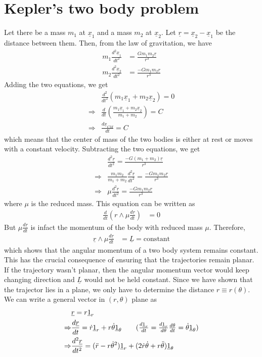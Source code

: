 \documentclass[11pt,a4paper]{article}
\newcommand{\vect}[1]{\underline{#1}}
\newcommand{\1}{\vect{1}}
\begin{document}
\section{Kepler's two body problem}
Let there be a mass $m_1$ at $\vect x_1$ and a mass $m_2$ at $\vect x_2$. Let $\vect r = \vect x_2 - \vect x_1$ be the distance between them. Then, from the law of gravitation, we have
\begin{align*}
m_1 \frac{d^2 \vect x_1}{dt^2} &= \frac{G m_1 m_2 \vect r}{r^3}\\
m_2 \frac{d^2 \vect x_2}{dt^2} &= \frac{-G m_1 m_2 \vect r}{r^3}
\end{align*}
Adding the two equations, we get
\begin{align*}
&\frac{d^2}{dt^2} (m_1\vect x_1 + m_2\vect x_2) = 0 \\
\Rightarrow&\frac{d}{dt} (\frac{m_1\vect x_1 + m_2\vect x_2}{m_1+m_2}) = C\\
\Rightarrow&\frac{d\vect x_{CM}}{dt} = C
\end{align*}
which means that the center of mass of the two bodies is either at rest or moves with a constant velocity. Subtracting the two equations, we get
\begin{align*}
&\frac{d^2\vect r}{dt^2} = \frac{-G (m_1 + m_2)\vect r}{r^3}\\
\Rightarrow&\frac{m_1m_2}{m_1 + m_2}\frac{d^2\vect r}{dt^2} = \frac{-G m_1 m_2 \vect r}{r^3}\\
\Rightarrow&\mu\frac{d^2\vect r}{dt^2} = \frac{-G m_1 m_2 \vect r}{r^3}
\end{align*}
where $\mu$ is the reduced mass. This equation can be written as
\begin{align*}
\frac{d}{dt}(r\wedge\mu \frac{d\vect r}{dt}) &= 0
\end{align*}
But $\mu \frac{d\vect r}{dt}$ is infact the momentum of the body with reduced mass $\mu$. Therefore,
\begin{align*}
\vect r \wedge \mu \frac{d\vect r}{dt} &= \vect L = \text{constant}
\end{align*}
which shows that the angular momentum of a two body system remains constant. This has the crucial consequence of ensuring that the trajectories remain planar. If the trajectory wasn't planar, then the angular momentum vector would keep changing direction and $\vect L$ would not be held constant. Since we have shown that the trajector lies in a plane, we only have to determine the distance $r \equiv r(\theta)$. We can write a general vector in $(r,\theta)$  plane as
\begin{align*}
&\vect r = r \1_r\\
\Rightarrow& \frac{d\vect r}{dt} = \dot{r}\1_r + r\dot\theta \1_{\theta} \tag{$\frac{d \vect 1_r}{dt} = \frac{d \vect 1_r}{d\theta}\frac{d\theta}{dt} = \dot{\theta} \vect 1_{\theta}$}\\
\Rightarrow& \frac{d^2\vect r}{dt^2} = (\ddot{r} - r \dot{\theta}^2)\1_r + (2\dot r \dot{\theta} + r \ddot{\theta})\1_{\theta}
\end{align*}
\end{document}
